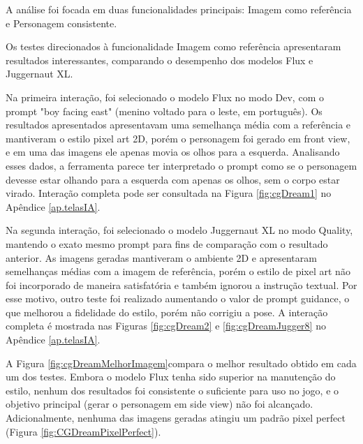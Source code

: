 A análise foi focada em duas funcionalidades principais: Imagem como referência e Personagem consistente.

Os testes direcionados à funcionalidade Imagem como referência apresentaram resultados interessantes, comparando o desempenho dos modelos Flux e Juggernaut XL.

Na primeira interação, foi selecionado o modelo Flux no modo Dev, com o prompt "boy facing east" (menino voltado para o leste, em português). Os resultados apresentados apresentavam uma semelhança média com a referência e mantiveram o estilo pixel art 2D, porém o personagem foi gerado em front view, e em uma das imagens ele apenas movia os olhos para a esquerda. Analisando esses dados, a ferramenta parece ter interpretado o prompt como se o personagem devesse estar olhando para a esquerda com apenas os olhos, sem o corpo estar virado. Interação completa pode ser consultada na Figura \ref{fig:cgDream1} no Apêndice \ref{ap.telasIA}.

Na segunda interação, foi selecionado o modelo Juggernaut XL no modo Quality, mantendo o exato mesmo prompt para fins de comparação com o resultado anterior. As imagens geradas mantiveram o ambiente 2D e apresentaram semelhanças médias com a imagem de referência, porém o estilo de pixel art não foi incorporado de maneira satisfatória e também ignorou a instrução textual. Por esse motivo, outro teste foi realizado aumentando o valor de prompt guidance, o que melhorou a fidelidade do estilo, porém não corrigiu a pose. A interação completa é mostrada nas Figuras \ref{fig:cgDream2} e \ref{fig:cgDreamJugger8} no Apêndice \ref{ap.telasIA}. 

A Figura \ref{fig:cgDreamMelhorImagem}compara o melhor resultado obtido em cada um dos testes. Embora o modelo Flux tenha sido superior na manutenção do estilo, nenhum dos resultados foi consistente o suficiente para uso no jogo, e o objetivo principal (gerar o personagem em side view) não foi alcançado. Adicionalmente, nenhuma das imagens geradas atingiu um padrão pixel perfect (Figura \ref{fig:CGDreamPixelPerfect}).


